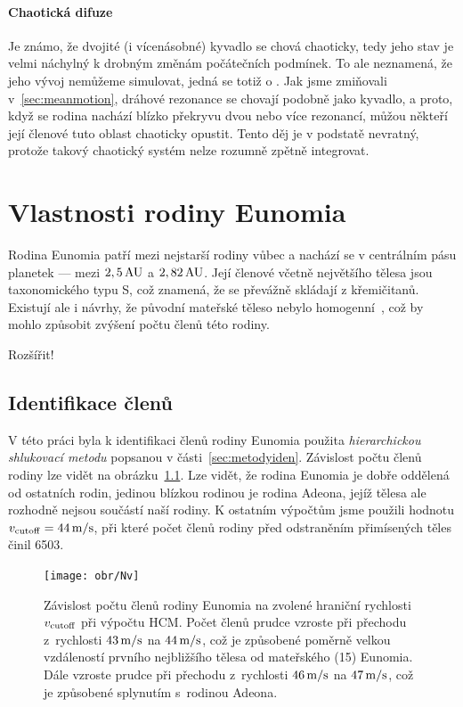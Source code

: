 \documentclass[A4paper, 12pt, oneside]{book}
\begin{document}
\subsubsection{Chaotická difuze}
Je známo, že dvojité (i vícenásobné) kyvadlo se chová chaoticky, tedy jeho stav je velmi náchylný k drobným změnám počátečních podmínek. To ale neznamená, že jeho vývoj nemůžeme simulovat, jedná se totiž o . Jak jsme zmiňovali v~\ref{sec:meanmotion}, dráhové rezonance se chovají podobně jako kyvadlo, a proto, když se rodina nachází blízko překryvu dvou nebo více rezonancí, můžou někteří její členové tuto oblast chaoticky opustit. Tento děj je v podstatě nevratný, protože takový chaotický systém nelze rozumně zpětně integrovat.

\chapter{Vlastnosti rodiny Eunomia} \label{ch:eunomia}
Rodina Eunomia patří mezi nejstarší rodiny vůbec a nachází se v centrálním pásu planetek --- mezi $2,5\,{\rm AU}$ a $2,82\,{\rm AU}$. Její členové včetně největšího tělesa jsou taxonomického typu S, což znamená, že se převážně skládají z křemičitanů. Existují ale i návrhy, že původní mateřské těleso nebylo homogenní~\cite{nathues05}, což by mohlo způsobit zvýšení počtu členů této rodiny.

Rozšířit!

\section{Identifikace členů}

V této práci byla k identifikaci členů rodiny Eunomia použita \textit{hierarchickou shlukovací metodu} popsanou v části~\ref{sec:metodyiden}. Závislost počtu členů rodiny lze vidět na obrázku~\ref{fig:Nv}. Lze vidět, že rodina Eunomia je dobře oddělená od ostatních rodin, jedinou blízkou rodinou je rodina Adeona, jejíž tělesa ale rozhodně nejsou součástí naší rodiny. K ostatním výpočtům jsme použili hodnotu $v_{\rm cutoff}=44\,{\rm m/s}$, při které počet členů rodiny před odstraněním přimísených těles činil 6503.

\begin{figure}
	\centering
	\texttt{[image: obr/Nv]}
	\caption{Závislost počtu členů rodiny Eunomia na zvolené hraniční rychlosti $v_{\rm cutoff}$ při výpočtu HCM\@. Počet členů prudce vzroste při přechodu z~rychlosti $43\,{\rm m/s}$ na $44\,{\rm m/s}$, což je způsobené poměrně velkou vzdáleností prvního nejbližšího tělesa od mateřského (15) Eunomia. Dále vzroste prudce při přechodu z~rychlosti $46\,{\rm m/s}$ na $47\,{\rm m/s}$, což je způsobené splynutím s~rodinou Adeona.}
	\label{fig:Nv}
\end{figure}
\end{document}
